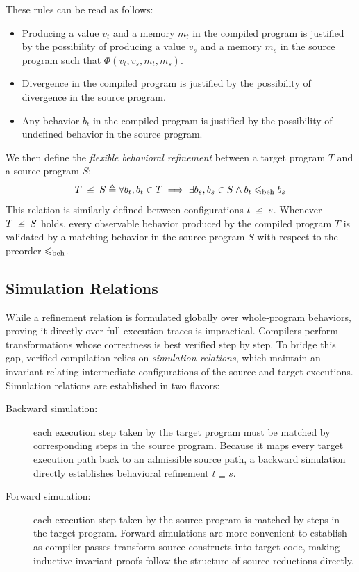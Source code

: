 \documentclass[report.tex]{subfiles}
\begin{document}
These rules can be read as follows:
\begin{itemize}
  \item Producing a value $v_t$ and a memory $m_t$ in the compiled program
        is justified by the possibility of producing a value
        $v_s$ and a memory $m_s$ in the source program such that
        $\Phi(v_t, v_s, m_t, m_s)$.

  \item Divergence in the compiled program
        is justified by the possibility of divergence in the source program.

  \item Any behavior $b_t$ in the compiled program
        is justified by the possibility of undefined behavior in the source
        program.
\end{itemize}

We then define the \emph{flexible behavioral refinement}
between a target program $T$ and a source program $S$:
\begin{equation}
  \label{eq:flex-beh-ref}
  T \slantsqsubseteq S
  \triangleq
  \forall b_t, b_t \in T \implies
  \exists b_s,
  b_s \in S \land b_t \behord b_s
\end{equation}
This relation is similarly defined
between configurations $t \slantsqsubseteq s$.
Whenever $T \slantsqsubseteq S$ holds,
every observable behavior produced by the compiled program $T$
is validated by a matching behavior in the source program $S$
with respect to the preorder $\leqslant_{\text{beh}}$.

\subsection{Simulation Relations}

While a refinement relation
is formulated globally over whole-program behaviors,
proving it directly over full execution traces is impractical.
Compilers perform transformations whose correctness is best verified
step by step.
To bridge this gap,
verified compilation relies on \emph{simulation relations},
which maintain an invariant relating intermediate configurations
of the source and target executions.
Simulation relations are established in two flavors:

\begin{description}
  \item[Backward simulation:]
        each execution step taken by the target program
        must be matched by corresponding steps in the source program.
        Because it maps every target execution path back to an admissible
        source path,
        a backward simulation directly establishes behavioral refinement
        $t \sqsubseteq s$.

  \item[Forward simulation:]
        each execution step taken by the source program
        is matched by steps in the target program.
        Forward simulations are more convenient to establish
        as compiler passes transform source constructs into target code,
        making inductive invariant proofs follow the structure of source
        reductions directly.
\end{description}
\end{document}
